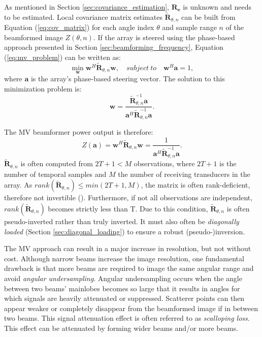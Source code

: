 As mentioned in Section \ref{sec:covariance_estimation}, $\boldsymbol{R_e}$ is unknown and needs to be estimated.
Local covariance matrix estimates $\boldsymbol{\tilde{R}}_{\theta,n}$ can be built from Equation (\ref{eq:cov_matrix}) for each angle index $\theta$ and sample range $n$ of the beamformed image $Z(\theta,n)$.
If the array is steered using the phase-based approach presented in Section \ref{sec:beamforming_frequency}, Equation (\ref{eq:mv_problem}) can be written as:
\begin{equation}
    \min_{\boldsymbol{w}} \boldsymbol{w}^H \boldsymbol{\tilde{R}}_{\theta,n} \boldsymbol{w}, \quad subject ~ to \quad \boldsymbol{w}^H \boldsymbol{a} = 1,
\label{eq:mv_problem_fixed}
\end{equation}
\noindent
where $\boldsymbol{a}$ is the array's phase-based steering vector.
The solution to this minimization problem is:
\begin{equation}
    \boldsymbol{w} = \frac{\boldsymbol{\tilde{R}}_{\theta,n}^{-1} \boldsymbol{a}}{\boldsymbol{a}^H \boldsymbol{\tilde{R}}_{\theta,n}^{-1} \boldsymbol{a}}.
\label{eq:mv_weight}
\end{equation}

\noindent
The MV beamformer power output is therefore:
\begin{equation}
    Z(\boldsymbol{a}) = \boldsymbol{w}^H \boldsymbol{\tilde{R}}_{\theta,n} \boldsymbol{w} =
    \frac{1}{\boldsymbol{a}^H \boldsymbol{\tilde{R}}_{\theta,n}^{-1} \boldsymbol{a}}.
\label{eq:mv_power}
\end{equation}
\noindent
$\boldsymbol{\tilde{R}}_{\theta, n}$ is often computed from $2T+1 < M$ observations, where $2T+1$ is the number of temporal samples and $M$ the number of receiving transducers in the array.  As $rank(\boldsymbol{\tilde{R}}_{\theta, n}) \leq min(2T+1, M)$, the matrix is often rank-deficient, therefore not invertible (\cite{Vignon_Focused}). Furthermore, if not all observations are independent, $rank(\boldsymbol{\tilde{R}}_{\theta, n})$ becomes strictly less than T. Due to this condition, $\boldsymbol{\tilde{R}}_{\theta, n}$ is often pseudo-inverted rather than truly inverted. It must also often be \textit{diagonally loaded} (Section \ref{sec:diagonal_loading}) to ensure a robust (pseudo-)inversion.

The MV approach can result in a major increase in resolution, but not without cost.
Although narrow beams increase the image resolution, one fundamental drawback is that more beams are required to image the same angular range and avoid \textit{angular undersampling}. Angular undersampling occurs when the angle between two beams' mainlobes becomes so large that it results in angles for which signals are heavily attenuated or suppressed. Scatterer points can then appear weaker or completely disappear from the beamformed image if in between two beams. This signal attenuation effect is often referred to as \textit{scalloping loss}. This effect can be attenuated by forming wider beams and/or more beams.

